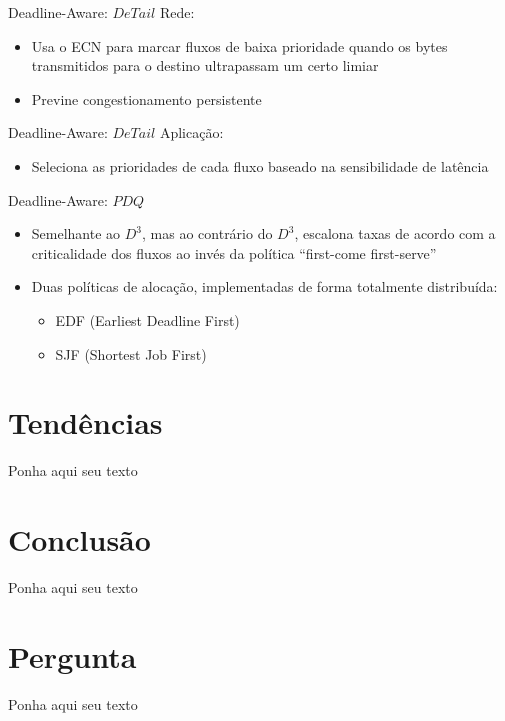 \documentclass[aspectratio=169]{beamer}
\begin{document}
	\begin{frame} {Deadline-Aware: $DeTail$}
		Rede:
		\begin{itemize}
		 	\item
		 		Usa o ECN para marcar fluxos de baixa prioridade quando os bytes transmitidos para o destino ultrapassam um certo limiar
		 	\item
				Previne congestionamento persistente
		 \end{itemize}
	\end{frame}

	\begin{frame} {Deadline-Aware: $DeTail$}
		Aplicação:
		\begin{itemize}
		 	\item
		 		Seleciona as prioridades de cada fluxo baseado na sensibilidade de latência
		 \end{itemize}
	\end{frame}

	\begin{frame} {Deadline-Aware: $PDQ$}
		\begin{itemize}
		 	\item
		 		Semelhante ao $D^3$, mas ao contrário do $D^3$, escalona taxas de acordo com a criticalidade dos fluxos ao invés da política “first-come first-serve”
		 	\item
		 		Duas políticas de alocação, implementadas de forma totalmente distribuída:
				\begin{itemize}
				 	\item
				 		EDF (Earliest Deadline First)
				 	\item
						SJF (Shortest Job First)
				 \end{itemize}
		\end{itemize}
	\end{frame}

\section{Tendências}
	\begin{frame} 
		Ponha aqui seu texto
	\end{frame}

\section{Conclusão}
	\begin{frame} 
		Ponha aqui seu texto
	\end{frame}
		
\section{Pergunta}
	\begin{frame} 
		Ponha aqui seu texto
	\end{frame}
	
\end{document}
